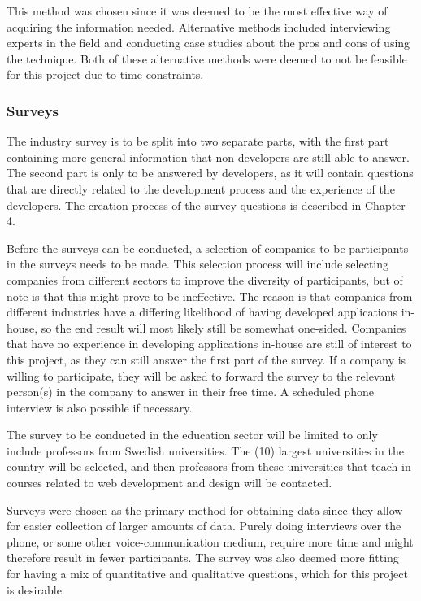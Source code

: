 \documentclass[a4paper,12pt]{article}
\begin{document}
This method was chosen since it was deemed to be the most effective way of acquiring the information needed. Alternative methods included interviewing experts in the field and conducting case studies about the pros and cons of using the technique. Both of these alternative methods were deemed to not be feasible for this project due to time constraints.

\subsubsection{Surveys}
The industry survey is to be split into two separate parts, with the first part containing more general information that non-developers are still able to answer. The second part is only to be answered by developers, as it will contain questions that are directly related to the development process and the experience of the developers. The creation process of the survey questions is described in Chapter 4.

Before the surveys can be conducted, a selection of companies to be participants in the surveys needs to be made. This selection process will include selecting companies from different sectors to improve the diversity of participants, but of note is that this might prove to be ineffective. The reason is that companies from different industries have a differing likelihood of having developed applications in-house, so the end result will most likely still be somewhat one-sided. Companies that have no experience in developing applications in-house are still of interest to this project, as they can still answer the first part of the survey. If a company is willing to participate, they will be asked to forward the survey to the relevant person(s) in the company to answer in their free time. A scheduled phone interview is also possible if necessary.

The survey to be conducted in the education sector will be limited to only include professors from Swedish universities. The (10) largest universities in the country will be selected, and then professors from these universities that teach in courses related to web development and design will be contacted.

Surveys were chosen as the primary method for obtaining data since they allow for easier collection of larger amounts of data. Purely doing interviews over the phone, or some other voice-communication medium, require more time and might therefore result in fewer participants. The survey was also deemed more fitting for having a mix of quantitative and qualitative questions, which for this project is desirable. 
\end{document}
